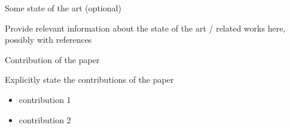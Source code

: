 \documentclass[presentation]{beamer}\mode<presentation>{\usetheme{blackAMSBolognaFC}}
\begin{document}
\begin{frame}{Some state of the art (optional)}

    Provide relevant information about the state of the art / related works here, possibly with references

\end{frame}

\begin{frame}{Contribution of the paper}

\begin{block}{Explicitly state the contributions of the paper}
    \begin{itemize}
        \item contribution 1
        \item contribution 2
    \end{itemize}
\end{block}

\end{frame}
\end{document}
